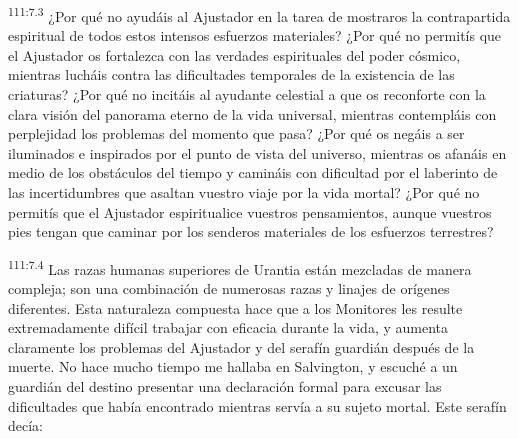 \documentclass[twoside, 11pt]{book}
\begin{document}
\par
\textsuperscript{111:7.3} ¿Por qué no ayudáis al Ajustador en la tarea de mostraros la contrapartida espiritual de todos estos intensos esfuerzos materiales? ¿Por qué no permitís que el Ajustador os fortalezca con las verdades espirituales del poder cósmico, mientras lucháis contra las dificultades temporales de la existencia de las criaturas? ¿Por qué no incitáis al ayudante celestial a que os reconforte con la clara visión del panorama eterno de la vida universal, mientras contempláis con perplejidad los problemas del momento que pasa? ¿Por qué os negáis a ser iluminados e inspirados por el punto de vista del universo, mientras os afanáis en medio de los obstáculos del tiempo y camináis con dificultad por el laberinto de las incertidumbres que asaltan vuestro viaje por la vida mortal? ¿Por qué no permitís que el Ajustador espiritualice vuestros pensamientos, aunque vuestros pies tengan que caminar por los senderos materiales de los esfuerzos terrestres?

\par
\textsuperscript{111:7.4} Las razas humanas superiores de Urantia están mezcladas de manera compleja; son una combinación de numerosas razas y linajes de orígenes diferentes. Esta naturaleza compuesta hace que a los Monitores les resulte extremadamente difícil trabajar con eficacia durante la vida, y aumenta claramente los problemas del Ajustador y del serafín guardián después de la muerte. No hace mucho tiempo me hallaba en Salvington, y escuché a un guardián del destino presentar una declaración formal para excusar las dificultades que había encontrado mientras servía a su sujeto mortal. Este serafín decía:
\end{document}
